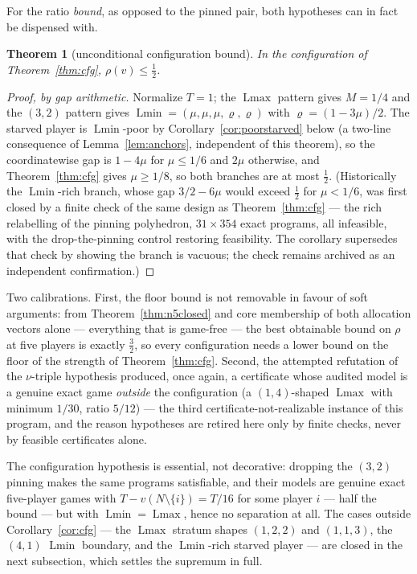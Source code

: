 \documentclass[11pt]{article}
\newtheorem{theorem}{Theorem}
\newcommand{\Lmin}{\operatorname{Lmin}}
\newcommand{\Lmax}{\operatorname{Lmax}}
\begin{document}
For the ratio \emph{bound}, as opposed to the pinned pair, both hypotheses
can in fact be dispensed with.

\begin{theorem}[unconditional configuration bound]\label{thm:cfgbound}
In the configuration of Theorem~\ref{thm:cfg}, $\rho(v)\le\tfrac12$.
\end{theorem}

\begin{proof}[Proof, by gap arithmetic]
Normalize $T=1$; the $\Lmax$ pattern gives $M=1/4$ and the $(3,2)$ pattern
gives $\Lmin=(\mu,\mu,\mu,\varrho,\varrho)$ with
$\varrho=(1-3\mu)/2$.  The starved player is $\Lmin$-poor by
Corollary~\ref{cor:poorstarved} below (a two-line consequence of
Lemma~\ref{lem:anchors}, independent of this theorem), so the
coordinatewise gap is $1-4\mu$ for $\mu\le1/6$ and $2\mu$ otherwise, and
Theorem~\ref{thm:cfg} gives $\mu\ge1/8$, so both branches are at most
$\tfrac12$.  (Historically the $\Lmin$-rich branch, whose gap $3/2-6\mu$
would exceed $\tfrac12$ for $\mu<1/6$, was first closed by a finite check
of the same design as Theorem~\ref{thm:cfg} --- the rich relabelling of
the pinning polyhedron, $31\times354$ exact programs, all infeasible,
with the drop-the-pinning control restoring feasibility.  The corollary
supersedes that check by showing the branch is vacuous; the check remains
archived as an independent confirmation.)
\end{proof}

Two calibrations.  First, the floor bound is not removable in favour of
soft arguments: from Theorem~\ref{thm:n5closed} and core membership of both
allocation vectors alone --- everything that is game-free --- the best
obtainable bound on $\rho$ at five players is exactly $\tfrac32$, so every
configuration needs a lower bound on the floor of the strength of
Theorem~\ref{thm:cfg}.  Second, the attempted refutation of the
$\nu$-triple hypothesis produced, once again, a certificate whose audited
model is a genuine exact game \emph{outside} the configuration (a
$(1,4)$-shaped $\Lmax$ with minimum $1/30$, ratio $5/12$) --- the third
certificate-not-realizable instance of this program, and the reason
hypotheses are retired here only by finite checks, never by feasible
certificates alone.

The configuration hypothesis is essential, not decorative: dropping the
$(3,2)$ pinning makes the same programs satisfiable, and their models are
genuine exact five-player games with $T-v(N\setminus\{i\})=T/16$ for some
player $i$ --- half the bound --- but with $\Lmin=\Lmax$, hence no
separation at all.  The cases outside Corollary~\ref{cor:cfg} --- the
$\Lmax$ stratum shapes $(1,2,2)$ and $(1,1,3)$, the $(4,1)$ $\Lmin$
boundary, and the $\Lmin$-rich starved player --- are closed in the next
subsection, which settles the supremum in full.
\end{document}
